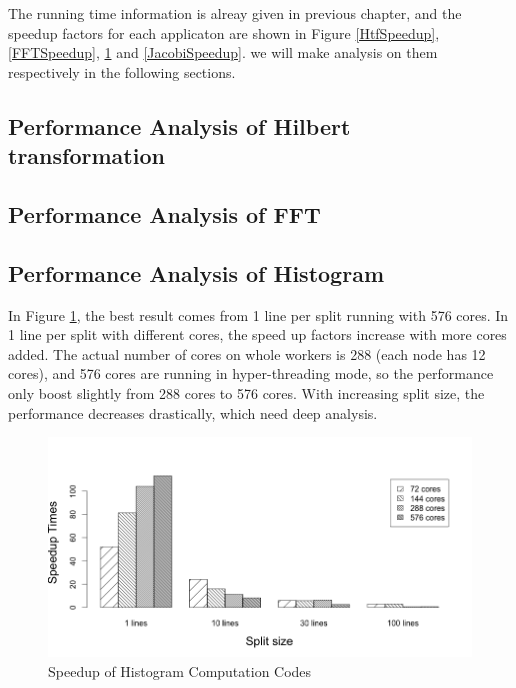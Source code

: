 The running time information is alreay given in previous chapter, and the speedup factors for each applicaton are shown in Figure \ref{HtfSpeedup}, \ref{FFTSpeedup}, \ref{HistSpeedup} and \ref{JacobiSpeedup}. we will make analysis on them respectively in the following sections. 

\subsection{Performance Analysis of Hilbert transformation}


\subsection{Performance Analysis of FFT}

 
\subsection{Performance Analysis of Histogram}
In Figure \ref{HistSpeedup}, the best result comes from 1 line per split running with 576 cores. In 1 line per split with different cores, the speed up factors increase with more cores added. The actual number of cores on whole workers is 288 (each node has 12 cores), and 576 cores are running in hyper-threading mode, so the performance only boost slightly from 288 cores to 576 cores. With increasing split size, the performance decreases drastically, which need deep analysis. 

\begin{figure}[h]
\includegraphics[scale=.50]{figures/HistSpeedup.png}
\caption{Speedup of Histogram Computation Codes}
\label{HistSpeedup}
\end{figure}

